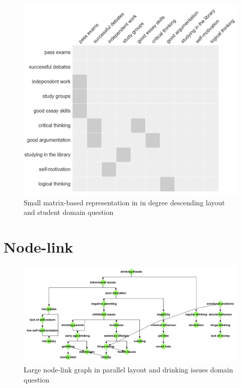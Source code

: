\documentclass{l4proj}
\begin{document}
\begin{appendices}
\begin{figure}[H]
\centering
\includegraphics[width=15cm]{images/studentSmallInDD.PNG}
\caption{Small matrix-based representation in in degree descending layout and student domain question}
\label{studentSmallInDD}
\end{figure}

\section{Node-link}

\begin{figure}
\centering
\includegraphics[width=20cm]{images/drinkingIssuesLargeParallel.jpg}
\caption{Large node-link graph in parallel layout and drinking issues domain question}
\label{drinkingIssuesLargeParallel}
\end{figure}


\end{appendices}
\end{document}
